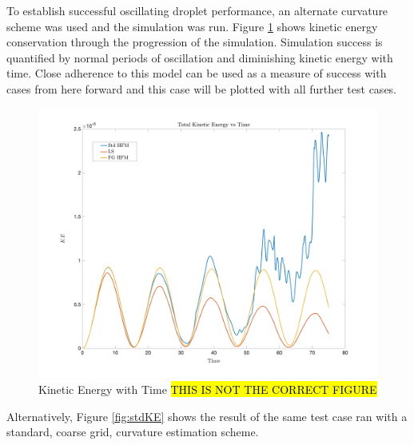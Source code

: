 To establish successful oscillating droplet performance, an alternate curvature scheme was used and the simulation was run. Figure \ref{fig:acesKE} shows kinetic energy conservation through the progression of the simulation. Simulation success is quantified by normal periods of oscillation and diminishing kinetic energy with time. Close adherence to this model can be used as a measure of success with cases from here forward and this case will be plotted with all further test cases. 

\begin{figure}[h]
	\centering
	\includegraphics[width=5.0in]{figs/KEvT}
	\caption{Kinetic Energy with Time \hl{THIS IS NOT THE CORRECT FIGURE}}
	\label{fig:acesKE}
\end{figure}

 Alternatively, Figure \ref{fig:stdKE} shows the result of the same test case ran with a standard, coarse grid, curvature estimation scheme. 

